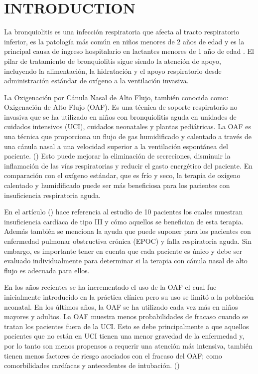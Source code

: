 \section{INTRODUCTION} \label{sec:itroduction}

La bronquiolitis es una infección respiratoria que afecta al tracto respiratorio inferior, es la patología más común en niños menores de 2 años de edad y es la principal causa de ingreso hospitalario en lactantes menores de 1 año de edad . El pilar de tratamiento de bronquiolitis sigue siendo la atención de apoyo, incluyendo la alimentación, la hidratación y el apoyo respiratorio desde administración estándar de oxígeno a la ventilación invasiva. 

La Oxigenación por Cánula Nasal de Alto Flujo, también conocida como: Oxigenación de Alto Flujo (OAF). Es una técnica de soporte respiratorio no invasiva que se ha utilizado en niños con bronquiolitis aguda en unidades de cuidados intensivos (UCI), cuidados neonatales y plantas pediátricas. La OAF es una técnica que proporciona un flujo de gas humidificado y calentado a través de una cánula nasal a una velocidad superior a la ventilación espontánea del paciente. (\cite{Daverio2019}) Esto puede mejorar la eliminación de secreciones, disminuir la inflamación de las vías respiratorias y reducir el gasto energético del paciente. En comparación con el oxígeno estándar, que es frío y seco, la terapia de oxígeno calentado y humidificado puede ser más beneficiosa para los pacientes con insuficiencia respiratoria aguda. 

En el artículo (\cite{Lodeserto2018}) hace referencia al estudio de 10 pacientes los cuales muestran insuficiencia cardíaca de tipo III y cómo aquellos se benefician de esta terapia. Además también se menciona la ayuda que puede suponer para los pacientes con enfermedad pulmonar obstructiva crónica (EPOC) y falla respiratoria aguda. Sin embargo, es importante tener en cuenta que cada paciente es único y debe ser evaluado individualmente para determinar si la terapia con cánula nasal de alto flujo es adecuada para ellos.

En los años recientes se ha incrementado el uso de la OAF el cual fue inicialmente introducido en la práctica clínica pero su uso se limitó a la población neonatal. En los últimos años, la OAF se ha utilizado cada vez más en niños mayores y adultos. La OAF muestra menos probabilidades de fracaso cuando se tratan los pacientes fuera de la UCI. Esto se debe principalmente a que aquellos pacientes que no están en UCI tienen una menor gravedad de la enfermedad y, por lo tanto son menos propensos a requerir una atención más intensiva, también tienen menos factores de riesgo asociados con el fracaso del OAF; como comorbilidades cardíacas y antecedentes de intubación. (\cite{Betters2017}) 


